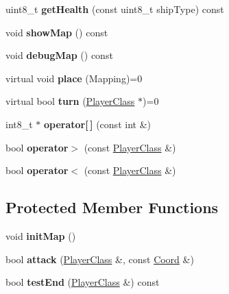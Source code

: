 \begin{DoxyCompactItemize}
\item 
\mbox{\label{class_player_class_ae231ed4b1d9bef35b6858a3c12f4793c}} 
uint8\+\_\+t {\bfseries get\+Health} (const uint8\+\_\+t ship\+Type) const
\item 
\mbox{\label{class_player_class_a06d9d492f22494c85873613ab8228ceb}} 
void {\bfseries show\+Map} () const
\item 
\mbox{\label{class_player_class_a94c3182464ed48138c0d8e5bf8c4bde5}} 
void {\bfseries debug\+Map} () const
\item 
\mbox{\label{class_player_class_af3190d139b6cfc8cc234468b195d7751}} 
virtual void {\bfseries place} (Mapping)=0
\item 
\mbox{\label{class_player_class_a60dc08da52603fe55c4dfda07c44ff66}} 
virtual bool {\bfseries turn} (\mbox{\hyperlink{class_player_class}{Player\+Class}} $\ast$)=0
\item 
\mbox{\label{class_player_class_a761e6d548e15c201997578eb723100e1}} 
int8\+\_\+t $\ast$ {\bfseries operator\mbox{[}$\,$\mbox{]}} (const int \&)
\item 
\mbox{\label{class_player_class_ac183fa351b5ce540abaa8eec19a99a5e}} 
bool {\bfseries operator$>$} (const \mbox{\hyperlink{class_player_class}{Player\+Class}} \&)
\item 
\mbox{\label{class_player_class_a8917796fc275944cd84b8a2f1e8298ab}} 
bool {\bfseries operator$<$} (const \mbox{\hyperlink{class_player_class}{Player\+Class}} \&)
\end{DoxyCompactItemize}
\subsection*{Protected Member Functions}
\begin{DoxyCompactItemize}
\item 
\mbox{\label{class_player_class_ae2a729fc13bea6b77e52546e45dd255f}} 
void {\bfseries init\+Map} ()
\item 
\mbox{\label{class_player_class_af85f6427f35b58d9397b9ff149fe6a45}} 
bool {\bfseries attack} (\mbox{\hyperlink{class_player_class}{Player\+Class}} \&, const \mbox{\hyperlink{struct_player_class_1_1_coord}{Coord}} \&)
\item 
\mbox{\label{class_player_class_a25be647df1b829a7f46519feb6eae151}} 
bool {\bfseries test\+End} (\mbox{\hyperlink{class_player_class}{Player\+Class}} \&) const
\end{DoxyCompactItemize}
